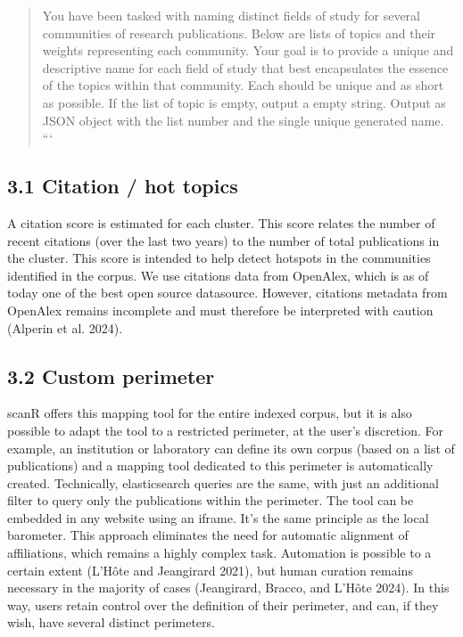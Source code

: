 \documentclass[
]{article}
\begin{document}
\begin{quote}
You have been tasked with naming distinct fields of study for several
communities of research publications. Below are lists of topics and
their weights representing each community. Your goal is to provide a
unique and descriptive name for each field of study that best
encapsulates the essence of the topics within that community. Each
should be unique and as short as possible. If the list of topic is
empty, output a empty string. Output as JSON object with the list number
and the single unique generated name. ```
\end{quote}

\hypertarget{citation-hot-topics}{%
\subsection{3.1 Citation / hot topics}\label{citation-hot-topics}}

A citation score is estimated for each cluster. This score relates the
number of recent citations (over the last two years) to the number of
total publications in the cluster. This score is intended to help detect
hotspots in the communities identified in the corpus. We use citations
data from OpenAlex, which is as of today one of the best open source
datasource. However, citations metadata from OpenAlex remains incomplete
and must therefore be interpreted with caution (Alperin et al. 2024).

\hypertarget{custom-perimeter}{%
\subsection{3.2 Custom perimeter}\label{custom-perimeter}}

scanR offers this mapping tool for the entire indexed corpus, but it is
also possible to adapt the tool to a restricted perimeter, at the user's
discretion. For example, an institution or laboratory can define its own
corpus (based on a list of publications) and a mapping tool dedicated to
this perimeter is automatically created. Technically, elasticsearch
queries are the same, with just an additional filter to query only the
publications within the perimeter. The tool can be embedded in any
website using an iframe. It's the same principle as the local barometer.
This approach eliminates the need for automatic alignment of
affiliations, which remains a highly complex task. Automation is
possible to a certain extent (L'Hôte and Jeangirard 2021), but human
curation remains necessary in the majority of cases (Jeangirard, Bracco,
and L'Hôte 2024). In this way, users retain control over the definition
of their perimeter, and can, if they wish, have several distinct
perimeters.
\end{document}
